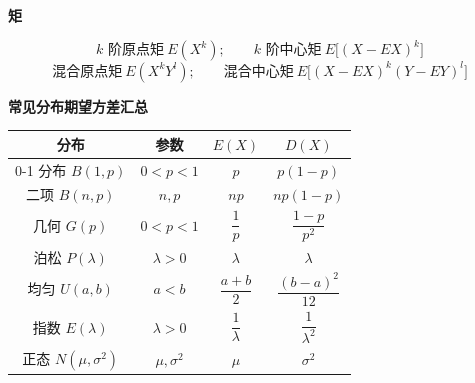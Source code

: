 \documentclass[11pt,a4paper]{ctexart}
\newcommand{\hd}[1]{\textbf{\color{mainc!85!black}#1}\par\nobreak\nopagebreak[4]}
\begin{document}
\begin{secbox}[四、随机变量的数字特征]
\hd{矩}
\begin{formbox}
\[
\text{$k$ 阶原点矩}\ E(X^{k});\qquad
\text{$k$ 阶中心矩}\ E\bigl[(X-EX)^{k}\bigr]
\]
\[
\text{混合原点矩}\ E(X^{k}Y^{l});\qquad
\text{混合中心矩}\ E\bigl[(X-EX)^{k}(Y-EY)^{l}\bigr]
\]
\end{formbox}

\hd{常见分布期望方差汇总}
\begin{formbox}
\begin{center}
\renewcommand{\arraystretch}{1.5}
\begin{tabular}{|c|c|c|c|}
\hline
分布 & 参数 & $E(X)$ & $D(X)$ \\ \hline
0-1 分布 $B(1,p)$ & $0<p<1$ & $p$ & $p(1-p)$ \\ \hline
二项 $B(n,p)$ & $n,p$ & $np$ & $np(1-p)$ \\ \hline
几何 $G(p)$ & $0<p<1$ & $\dfrac1p$ & $\dfrac{1-p}{p^{2}}$ \\ \hline
泊松 $P(\lambda)$ & $\lambda>0$ & $\lambda$ & $\lambda$ \\ \hline
均匀 $U(a,b)$ & $a<b$ & $\dfrac{a+b}{2}$ & $\dfrac{(b-a)^{2}}{12}$ \\ \hline
指数 $E(\lambda)$ & $\lambda>0$ & $\dfrac1\lambda$ & $\dfrac1{\lambda^{2}}$ \\ \hline
正态 $N(\mu,\sigma^{2})$ & $\mu,\sigma^{2}$ & $\mu$ & $\sigma^{2}$ \\ \hline
\end{tabular}
\end{center}
\end{formbox}
\end{secbox}
\end{document}
